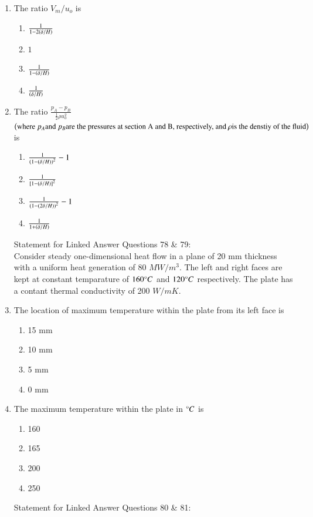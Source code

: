 \documentclass[journal,12pt,onecolumn,article]{IEEEtran}
\theoremstyle{remark}
\begin{document}
\begin{enumerate}
	\item The ratio $V_m/u_o$ is
		\begin{enumerate}
			\item $\frac{1}{1-2\left(\delta/H\right)}$
			\item $1$
			\item $\frac{1}{1-\left(\delta/H\right)}$
			\item $\frac{1}{\left(\delta/H\right)}$ 
		\end{enumerate}
	\item The ratio $\frac{p_A-p_B}{\frac{1}{2}\rho u_{o}^2}$ $\left(\text{where }p_A \text{and }p_B \text{are the pressures at section A and B, respectively, and }\rho \text{is the denstiy of the fluid}\right)$ is
		\begin{enumerate}
			\item $\frac{1}{\left(1-\left(\delta/H\right)\right)^2}-1$
			\item $\frac{1}{{}\left[1-\left(\delta/H\right)\right]^2}$
			\item $\frac{1}{\left(1-\left(2\delta/H\right)\right)^2}-1$
			\item $\frac{1}{1+\left(\delta/H\right)}$
		\end{enumerate}
		Statement for Linked Answer Questions 78 \& 79: \\
		Consider steady one-dimensional heat flow in a plane of 20 mm thickness with a uniform heat generation of 80 $MW/m^3$. The left and right faces are kept at constant temparature of $160\degree C$ and $120\degree C$ respectively. The plate has a contant thermal conductivity of 200 $W/mK$.
	\item The location of maximum temperature within the plate from its left face is 
		\begin{enumerate}
			\item 15 mm
			\item 10 mm
			\item 5 mm
			\item 0 mm
		\end{enumerate}
	\item The maximum temperature within the plate in $\degree C$ is 
		\begin{enumerate}
			\item 160
			\item 165
			\item 200
			\item 250
		\end{enumerate}
		Statement for Linked Answer Questions 80 \& 81:\\
		\vspace{-70pt}

\end{enumerate}
\end{document}
